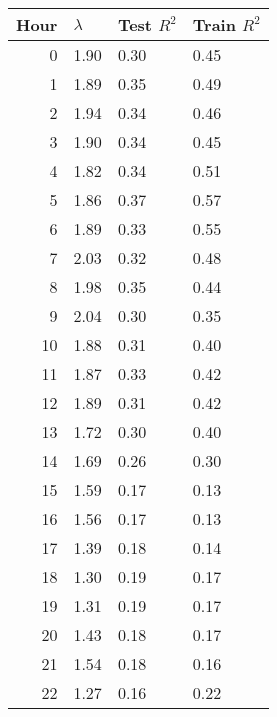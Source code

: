 \begin{tabular}{rlll}
\toprule
 Hour & $\lambda$ & Test $R^2$ & Train $R^2$ \\
\midrule
    0 &      1.90 &       0.30 &        0.45 \\
    1 &      1.89 &       0.35 &        0.49 \\
    2 &      1.94 &       0.34 &        0.46 \\
    3 &      1.90 &       0.34 &        0.45 \\
    4 &      1.82 &       0.34 &        0.51 \\
    5 &      1.86 &       0.37 &        0.57 \\
    6 &      1.89 &       0.33 &        0.55 \\
    7 &      2.03 &       0.32 &        0.48 \\
    8 &      1.98 &       0.35 &        0.44 \\
    9 &      2.04 &       0.30 &        0.35 \\
   10 &      1.88 &       0.31 &        0.40 \\
   11 &      1.87 &       0.33 &        0.42 \\
   12 &      1.89 &       0.31 &        0.42 \\
   13 &      1.72 &       0.30 &        0.40 \\
   14 &      1.69 &       0.26 &        0.30 \\
   15 &      1.59 &       0.17 &        0.13 \\
   16 &      1.56 &       0.17 &        0.13 \\
   17 &      1.39 &       0.18 &        0.14 \\
   18 &      1.30 &       0.19 &        0.17 \\
   19 &      1.31 &       0.19 &        0.17 \\
   20 &      1.43 &       0.18 &        0.17 \\
   21 &      1.54 &       0.18 &        0.16 \\
   22 &      1.27 &       0.16 &        0.22 \\
\bottomrule
\end{tabular}
